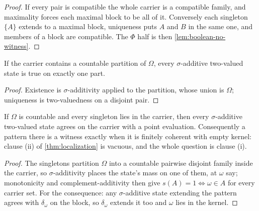 \begin{proof}
  \leanok
  If every pair is compatible the whole carrier is a compatible family, and
  maximality forces each maximal block to be all of it. Conversely each
  singleton $\{A\}$ extends to a maximal block, uniqueness puts $A$ and $B$ in
  the same one, and members of a block are compatible. The $\Phi$ half is then
  \ref{lem:boolean-no-witness}.
\end{proof}
\begin{lemma}
  \label{lem:concentration-partition}
  \leanok
  If the carrier contains a countable partition of $\Omega$, every
  $\sigma$-additive two-valued state is true on exactly one part.
\end{lemma}

\begin{proof}
  \leanok
  Existence is $\sigma$-additivity applied to the partition, whose union is
  $\Omega$; uniqueness is two-valuedness on a disjoint pair.
\end{proof}

\begin{theorem}
  \label{thm:countable-point-determined}
  \leanok
  If $\Omega$ is countable and every singleton lies in the carrier, then every
  $\sigma$-additive two-valued state agrees on the carrier with a point
  evaluation. Consequently a pattern there is a witness exactly when it is
  finitely coherent with empty kernel: clause (ii) of \ref{thm:localization} is
  vacuous, and the whole question is clause (i).
\end{theorem}

\begin{proof}
  \leanok
  The singletons partition $\Omega$ into a countable pairwise disjoint family
  inside the carrier, so $\sigma$-additivity places the state's mass on one of
  them, at $\omega$ say; monotonicity and complement-additivity then give
  $s(A) = 1 \iff \omega \in A$ for every carrier set. For the consequence: any
  $\sigma$-additive state extending the pattern agrees with $\delta_\omega$ on
  the block, so $\delta_\omega$ extends it too and $\omega$ lies in the kernel.
\end{proof}





